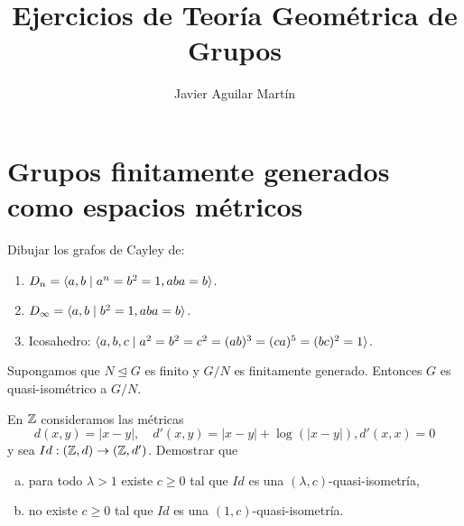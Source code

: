 \documentclass[twoside]{article}
\begin{document}
\title{Ejercicios de Teoría Geométrica de Grupos}
\author{Javier Aguilar Martín}
\maketitle

\section{Grupos finitamente generados como espacios métricos}

\begin{ejercicio}{1.1}
Dibujar los grafos de Cayley de:
\begin{enumerate}
\item $D_n=\langle{a,b\mid a^n=b^2=1,aba=b}\rangle$.
\item $D_\infty=\langle{a,b\mid b^2=1,aba=b}\rangle$.
\item Icosahedro: $\langle{a,b,c\mid a^2=b^2=c^2=(ab)^3=(ca)^5=(bc)^2=1}\rangle$.
\end{enumerate}

\end{ejercicio}
\begin{solucion}

\end{solucion}

\newpage

\begin{ejercicio}{1.2}
Supongamos que $N\trianglelefteq G$ es finito y $G/N$ es finitamente generado. Entonces $G$ es quasi-isométrico a $G/N$. 
\end{ejercicio}
\begin{solucion}


\end{solucion}




\newpage

\begin{ejercicio}{1.3}
En $\mathbb{Z}$ consideramos las métricas
\[
d(x,y)=|x-y|,\quad d'(x,y)=|x-y|+\log(|x-y|), d'(x,x)=0
\]
y sea $Id:(\mathbb{Z},d)\to(\mathbb{Z},d')$. Demostrar que
\begin{enumerate}[a)]
\item para todo $\lambda>1$ existe $c\geq 0$ tal que $Id$ es una $(\lambda,c)$-quasi-isometría,
\item no existe $c\geq 0$ tal que $Id$ es una $(1,c)$-quasi-isometría.
\end{enumerate}
\end{ejercicio}
\begin{solucion}

\end{solucion}
\end{document}
